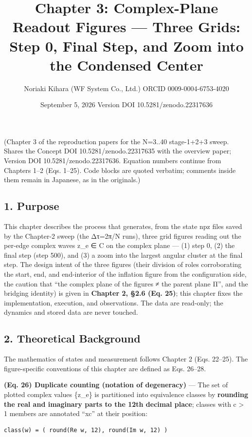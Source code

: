 \documentclass[
  a4paper,
]{ltjsarticle}
\title{Chapter 3: Complex-Plane Readout Figures --- Three Grids: Step 0,
Final Step, and Zoom into the Condensed Center}
\author{Noriaki Kihara (WF System Co., Ltd.) ORCID 0009-0004-6753-4020}
\date{September 5, 2026 Version DOI 10.5281/zenodo.22317636}
\begin{document}
\maketitle

(Chapter 3 of the reproduction papers for the N=3..40 stage-1+2+3 sweep.
Shares the Concept DOI 10.5281/zenodo.22317635 with the overview paper;
Version DOI 10.5281/zenodo.22317636. Equation numbers continue from
Chapters 1--2 (Eqs. 1--25). Code blocks are quoted verbatim; comments
inside them remain in Japanese, as in the originals.)

\subsection{1. Purpose}\label{purpose}

This chapter describes the process that generates, from the state npz
files saved by the Chapter-2 sweep (the Δτ=2π/N runs), three grid
figures reading out the per-edge complex waves z\_e ∈ C on the complex
plane --- (1) step 0, (2) the final step (step 500), and (3) a zoom into
the largest angular cluster at the final step. The design intent of the
three figures (their division of roles corroborating the start, end, and
end-interior of the inflation figure from the configuration side, the
caution that ``the complex plane of the figures ≠ the parent plane Π'',
and the bridging identity) is given in \textbf{Chapter 2, §2.6 (Eq.
25)}; this chapter fixes the implementation, execution, and
observations. The data are read-only; the dynamics and stored data are
never touched.

\subsection{2. Theoretical Background}\label{theoretical-background}

The mathematics of states and measurement follows Chapter 2 (Eqs.
22--25). The figure-specific conventions of this chapter are defined as
Eqs. 26--28.

\textbf{(Eq. 26) Duplicate counting (notation of degeneracy)} --- The
set of plotted complex values \{z\_e\} is partitioned into equivalence
classes by \textbf{rounding the real and imaginary parts to the 12th
decimal place}; classes with c \textgreater{} 1 members are annotated
``xc'' at their position:

\begin{verbatim}
class(w) = ( round(Re w, 12), round(Im w, 12) )
\end{verbatim}
\end{document}
